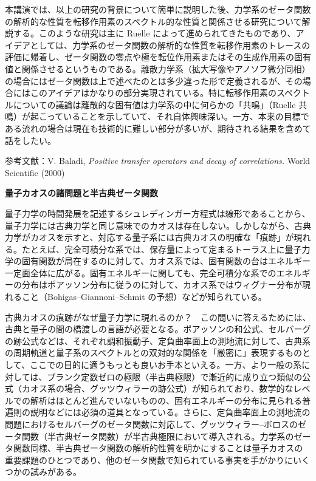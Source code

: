 \documentclass[uplatex,dvipdfmx]{jlreq}
\begin{document}
本講演では、以上の研究の背景について簡単に説明した後、力学系のゼータ関数の解析的な性質を転移作用素のスペクトル的な性質と関係させる研究について解説する。このような研究は主に Ruelle によって進められてきたものであり、アイデアとしては、力学系のゼータ関数の解析的な性質を転移作用素のトレースの評価に帰着し、ゼータ関数の零点や極を転位作用素またはその生成作用素の固有値と関係させるというものである。離散力学系（拡大写像やアノソフ微分同相）の場合にはゼータ関数は上で述べたのとは多少違った形で定義されるが、その場合にはこのアイデアはかなりの部分実現されている。特に転移作用素のスペクトルについての議論は離散的な固有値は力学系の中に何らかの「共鳴」（Ruelle 共鳴）が起こっていることを示していて、それ自体興味深い。一方、本来の目標である流れの場合は現在も技術的に難しい部分が多いが、期待される結果を含めて話をしたい。

\vspace{5mm}\noindent
参考文献：V. Baladi, \textit{Positive transfer operators and decay of correlations.} World Scientific (2000)

\newpage

\begin{center}
{\large\bfseries 量子カオスの諸問題と半古典ゼータ関数}\\[6pt]
\hspace*{\fill}{\large\bfseries 首藤　啓（首都大学東京・理工学研究科・物理学専攻）}
\end{center}

量子力学の時間発展を記述するシュレディンガー方程式は線形であることから、量子力学には古典力学と同じ意味でのカオスは存在しない。しかしながら、古典力学がカオスを示すと、対応する量子系には古典カオスの明確な「痕跡」が現れる。たとえば、完全可積分な系では、保存量によって定まるトーラス上に量子力学の固有関数が局在するのに対して、カオス系では、固有関数の台はエネルギー一定面全体に広がる。固有エネルギーに関しても、完全可積分な系でのエネルギーの分布はポアッソン分布に従うのに対して、カオス系ではウィグナー分布が現れること（Bohigas--Giannoni--Schmit の予想）などが知られている。

古典カオスの痕跡がなぜ量子力学に現れるのか？　この問いに答えるためには、古典と量子の間の橋渡しの言語が必要となる。ポアッソンの和公式、セルバーグの跡公式などは、それぞれ調和振動子、定負曲率面上の測地流に対して、古典系の周期軌道と量子系のスペクトルとの双対的な関係を「厳密に」表現するものとして、ここでの目的に適うもっとも良いお手本といえる。一方、より一般の系に対しては、プランク定数ゼロの極限（半古典極限）で漸近的に成り立つ類似の公式（カオス系の場合、グッツウィラーの跡公式）が知られており、数学的なレベルでの解析はほとんど進んでいないものの、固有エネルギーの分布に見られる普遍則の説明などには必須の道具となっている。さらに、定負曲率面上の測地流の問題におけるセルバーグのゼータ関数に対応して、グッツウィラー--ボロスのゼータ関数（半古典ゼータ関数）が半古典極限において導入される。力学系のゼータ関数同様、半古典ゼータ関数の解析的性質を明かにすることは量子カオスの重要課題のひとつであり、他のゼータ関数で知られている事実を手がかりにいくつかの試みがある。
\end{document}
